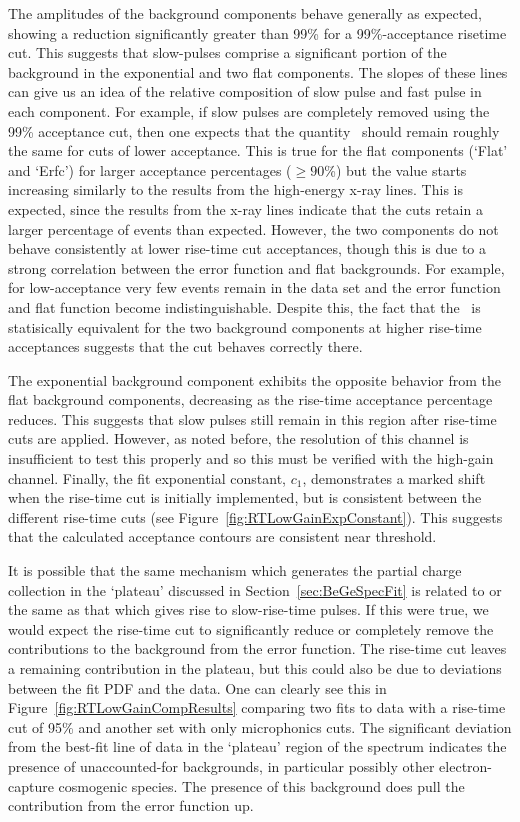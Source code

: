 The amplitudes of the background components behave generally as expected, showing a reduction significantly greater than 99\% for a 99\%-acceptance risetime cut.  This suggests that slow-pulses comprise a significant portion of the background in the exponential and two flat components.  The slopes of these lines can give us an idea of the relative composition of slow pulse and fast pulse in each component.  For example, if slow pulses are completely removed using the 99\% acceptance cut, then one expects that the quantity \releff~should remain roughly the same for cuts of lower acceptance. This is true for the flat components (`Flat' and `Erfc') for larger acceptance percentages ($\ge90$\%) but the value starts increasing similarly to the results from the high-energy x-ray lines.  This is expected, since the results from the x-ray lines indicate that the cuts retain a larger percentage of events than expected.  However, the two components do not behave consistently at lower rise-time cut acceptances, though this is due to a strong correlation between the error function and flat backgrounds.  For example, for low-acceptance very few events remain in the data set and the error function and flat function become indistinguishable.  Despite this, the fact that the \releff~is statisically equivalent for the two background components at higher rise-time acceptances suggests that the cut behaves correctly there.  %

The exponential background component exhibits the opposite behavior from the flat background components, decreasing as the rise-time acceptance percentage reduces.  This suggests that slow pulses still remain in this region after rise-time cuts are applied.  However, as noted before, the resolution of this channel is insufficient to test this properly and so this must be verified with the high-gain channel.  Finally, the fit exponential constant, $c_{1}$, demonstrates a marked shift when the rise-time cut is initially implemented, but is consistent between the different rise-time cuts (see Figure~\ref{fig:RTLowGainExpConstant}).  This suggests that the calculated acceptance contours are consistent near threshold.  

It is possible that the same mechanism which generates the partial charge collection in the `plateau' discussed in Section~\ref{sec:BeGeSpecFit} is related to or the same as that which gives rise to slow-rise-time pulses.  If this were true, we would expect the rise-time cut to significantly reduce or completely remove the contributions to the background from the error function.  The rise-time cut leaves a remaining contribution in the plateau, but this could also be due to deviations between the fit PDF and the data.  One can clearly see this in Figure~\ref{fig:RTLowGainCompResults} comparing two fits to data with a rise-time cut of 95\% and another set with only microphonics cuts.  The significant deviation from the best-fit line of data in the `plateau' region of the spectrum indicates the presence of unaccounted-for backgrounds, in particular possibly other electron-capture cosmogenic species.  The presence of this background does pull the contribution from the error function up.  



